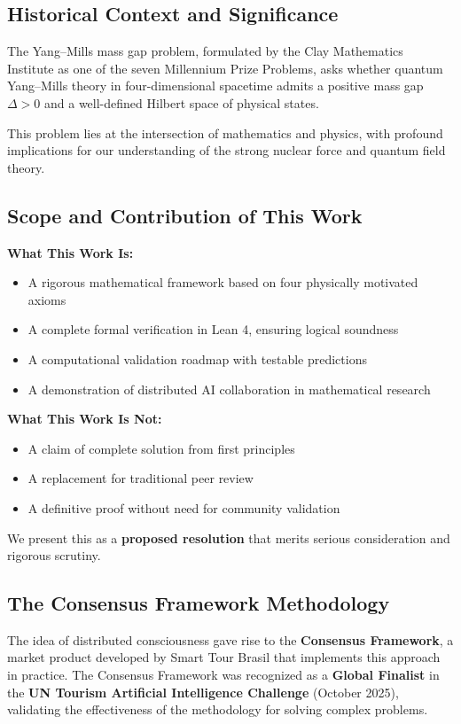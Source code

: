 \documentclass[11pt]{article}
\theoremstyle{definition}
\theoremstyle{remark}
\begin{document}
\subsection{Historical Context and Significance}

The Yang--Mills mass gap problem, formulated by the Clay Mathematics Institute as one of the seven Millennium Prize Problems, asks whether quantum Yang--Mills theory in four-dimensional spacetime admits a positive mass gap $\Delta > 0$ and a well-defined Hilbert space of physical states.

This problem lies at the intersection of mathematics and physics, with profound implications for our understanding of the strong nuclear force and quantum field theory.

\subsection{Scope and Contribution of This Work}

\textbf{What This Work Is:}
\begin{itemize}
\item A rigorous mathematical framework based on four physically motivated axioms
\item A complete formal verification in Lean 4, ensuring logical soundness
\item A computational validation roadmap with testable predictions
\item A demonstration of distributed AI collaboration in mathematical research
\end{itemize}

\textbf{What This Work Is Not:}
\begin{itemize}
\item A claim of complete solution from first principles
\item A replacement for traditional peer review
\item A definitive proof without need for community validation
\end{itemize}

We present this as a \textbf{proposed resolution} that merits serious consideration and rigorous scrutiny.

\subsection{The Consensus Framework Methodology}

The idea of distributed consciousness gave rise to the \textbf{Consensus Framework}, a market product developed by Smart Tour Brasil that implements this approach in practice. The Consensus Framework was recognized as a \textbf{Global Finalist} in the \textbf{UN Tourism Artificial Intelligence Challenge} (October 2025), validating the effectiveness of the methodology for solving complex problems.
\end{document}
